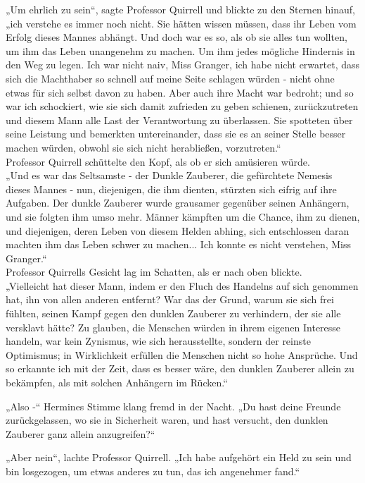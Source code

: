 {„Um ehrlich zu sein“, sagte Professor Quirrell und blickte zu den Sternen hinauf, „ich verstehe es immer noch nicht. Sie hätten wissen müssen, dass ihr Leben vom Erfolg dieses Mannes abhängt. Und doch war es so, als ob sie alles tun wollten, um ihm das Leben unangenehm zu machen. Um ihm jedes mögliche Hindernis in den Weg zu legen. Ich war nicht naiv, Miss Granger, ich habe nicht erwartet, dass sich die Machthaber so schnell auf meine Seite schlagen würden - nicht ohne etwas für sich selbst davon zu haben. Aber auch ihre Macht war bedroht; und so war ich schockiert, wie sie sich damit zufrieden zu geben schienen, zurückzutreten und diesem Mann alle Last der Verantwortung zu überlassen. Sie spotteten über seine Leistung und bemerkten untereinander, dass sie es an seiner Stelle besser machen würden, obwohl sie sich nicht herabließen, vorzutreten.“\\ Professor Quirrell schüttelte den Kopf, als ob er sich amüsieren würde.\\ „Und es war das Seltsamste - der Dunkle Zauberer, die gefürchtete Nemesis dieses Mannes - nun, diejenigen, die ihm dienten, stürzten sich eifrig auf ihre Aufgaben. Der dunkle Zauberer wurde grausamer gegenüber seinen Anhängern, und sie folgten ihm umso mehr. Männer kämpften um die Chance, ihm zu dienen, und diejenigen, deren Leben von diesem Helden abhing, sich entschlossen daran machten ihm das Leben schwer zu machen... Ich konnte es nicht verstehen, Miss Granger.“\\ Professor Quirrells Gesicht lag im Schatten, als er nach oben blickte.\\ „Vielleicht hat dieser Mann, indem er den Fluch des Handelns auf sich genommen hat, ihn von allen anderen entfernt? War das der Grund, warum sie sich frei fühlten, seinen Kampf gegen den dunklen Zauberer zu verhindern, der sie alle versklavt hätte? Zu glauben, die Menschen würden in ihrem eigenen Interesse handeln, war kein Zynismus, wie sich herausstellte, sondern der reinste Optimismus; in Wirklichkeit erfüllen die Menschen nicht so hohe Ansprüche. Und so erkannte ich mit der Zeit, dass es besser wäre, den dunklen Zauberer allein zu bekämpfen, als mit solchen Anhängern im Rücken.“

„Also -“ Hermines Stimme klang fremd in der Nacht. „Du hast deine Freunde zurückgelassen, wo sie in Sicherheit waren, und hast versucht, den dunklen Zauberer ganz allein anzugreifen?“

„Aber nein“, lachte Professor Quirrell. „Ich habe aufgehört ein Held zu sein und bin losgezogen, um etwas anderes zu tun, das ich angenehmer fand.“

}
